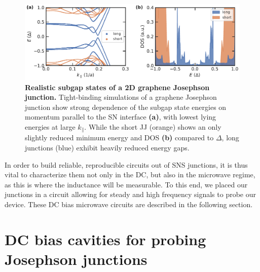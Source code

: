 \begin{figure}[t]
	\centering
	\includegraphics[width=\linewidth]{chapter-introduction/figs/kwant_modeling_181206_subgap_length_supp_Plot_subgap_dos}
	\caption{
		\textbf{Realistic subgap states of a 2D graphene Josephson junction.}
		Tight-binding simulations of a graphene Josephson junction show strong dependence of the subgap state energies on momentum parallel to the SN interface \textbf{(a)}, with lowest lying energies at large $k_\parallel$.
		While the short JJ (orange) shows an only slightly reduced minimum energy and DOS \textbf{(b)} compared to $\Delta$, long junctions (blue) exhibit heavily reduced energy gaps.
	}
	\label{fig:modelsubgap}
\end{figure}

In order to build reliable, reproducible circuits out of SNS junctions, it is thus vital to characterize them not only in the DC, but also in the microwave regime, as this is where the inductance will be measurable.
%
To this end, we placed our junctions in a circuit allowing for steady and high frequency signals to probe our device.
%
These DC bias microwave circuits are described in the following section.

\section{DC bias cavities for probing Josephson junctions}


